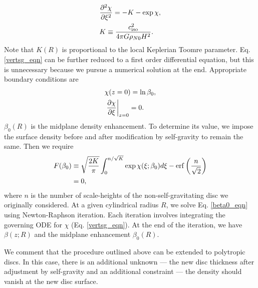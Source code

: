 \begin{align}
&\frac{\partial^2 \chi}{\partial\xi^2} = -K -\exp{\chi}\label{vertsg_eqn},\\
& K \equiv \frac{c_\mathrm{iso}^2}{4\pi G \rho_{N0} H^2}. \notag
\end{align}
Note that $K(R)$ is proportional to the local Keplerian Toomre
parameter. Eq. \ref{vertsg_eqn} can be further reduced to a first
order differential equation, but this is unnecessary because we
pursue a numerical solution at the end. Appropriate 
boundary conditions are
\begin{align}
&\chi(z=0)  =  \ln\beta_0, \\
&\left.\frac{\partial \chi}{\partial \xi} \right|_{z=0} = 0.
\end{align}
$\beta_0(R)$ is the midplane density enhancement. To determine its value, we impose
the surface density before and after modification by self-gravity to
remain the same. Then we require 
\begin{align}\label{beta0_eqn}
&F(\beta_0) \equiv \sqrt{\frac{2K}{\pi}}\int_0^{ n /\sqrt{K} } 
\exp{\chi(\xi;\beta_0)}d\xi - \operatorname{erf}{\left(\frac{n}{\sqrt{2}}\right)} \notag\\
&\phantom{F(\beta_0)} = 0,  
\end{align}
where $n$ is the number of scale-heights of the non-self-gravitating
disc we originally considered. At a given cylindrical radius $R$, we
solve Eq. \ref{beta0_eqn} using Newton-Raphson iteration. Each
iteration involves integrating the governing ODE for $\chi$
(Eq. \ref{vertsg_eqn}). At the end of the iteration, we have $\beta(z;
R)$ and the midplane enhancement $\beta_0(R)$.  

We comment that the procedure outlined above can be extended to
polytropic discs. In this case, there is an additional unknown --- 
the new disc thickness after adjustment by self-gravity and an
additional constraint --- the density should vanish at the new disc
surface. 
